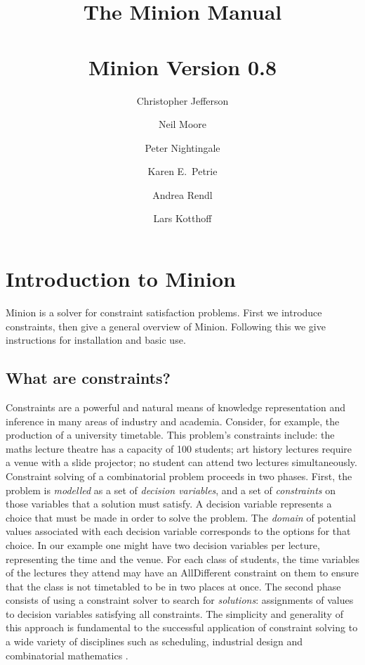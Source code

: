 \documentclass[oneside]{book}
\def\minionversion{0.8}
\begin{document}
\title{{\bf The Minion Manual}\\
~\\
Minion Version \minionversion}
\author{Christopher Jefferson \and Neil Moore \and Peter Nightingale \and Karen E.\ Petrie \and Andrea Rendl \and Lars Kotthof\/f}

\maketitle
\tableofcontents

\chapter{Introduction to Minion}

Minion is a solver for constraint satisfaction problems. First we
introduce constraints, then give a general overview of Minion. Following
this we give instructions for installation and basic use.


\section{What are constraints?}

Constraints are a powerful and natural means of knowledge representation
and inference in many areas of industry and academia. Consider, for
example, the production of a university timetable. This problem's
constraints include: the maths lecture theatre has a capacity of 100
students; art history lectures require a venue with a slide projector;
no student can attend two lectures simultaneously. Constraint solving
of a combinatorial problem proceeds in two phases. First, the problem
is \emph{modelled} as a set of \emph{decision variables}, and a set
of \emph{constraints} on those variables that a solution must satisfy.
A decision variable represents a choice that must be made in order
to solve the problem. The \emph{domain} of potential values associated
with each decision variable corresponds to the options for that choice.
In our example one might have two decision variables per lecture,
representing the time and the venue. For each class of students, the
time variables of the lectures they attend may have an AllDifferent
constraint on them to ensure that the class is not timetabled to be
in two places at once. The second phase consists of using a constraint
solver to search for \emph{solutions}: assignments of values to decision
variables satisfying all constraints. The simplicity and generality
of this approach is fundamental to the successful application of constraint
solving to a wide variety of disciplines such as scheduling, industrial
design and combinatorial mathematics \cite{wallace:Survey}.
\end{document}

